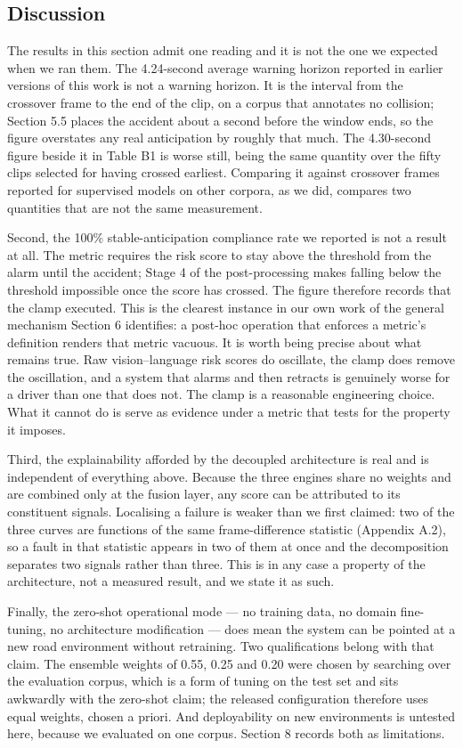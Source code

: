 \subsection{Discussion}
The results in this section admit one reading and it is not the one we expected when we ran them. The 4.24-second average warning horizon reported in earlier versions of this work is not a warning horizon. It is the interval from the crossover frame to the end of the clip, on a corpus that annotates no collision; Section 5.5 places the accident about a second before the window ends, so the figure overstates any real anticipation by roughly that much. The 4.30-second figure beside it in Table B1 is worse still, being the same quantity over the fifty clips selected for having crossed earliest. Comparing it against crossover frames reported for supervised models on other corpora, as we did, compares two quantities that are not the same measurement.

Second, the 100\% stable-anticipation compliance rate we reported is not a result at all. The metric requires the risk score to stay above the threshold from the alarm until the accident; Stage 4 of the post-processing makes falling below the threshold impossible once the score has crossed. The figure therefore records that the clamp executed. This is the clearest instance in our own work of the general mechanism Section 6 identifies: a post-hoc operation that enforces a metric's definition renders that metric vacuous. It is worth being precise about what remains true. Raw vision--language risk scores do oscillate, the clamp does remove the oscillation, and a system that alarms and then retracts is genuinely worse for a driver than one that does not. The clamp is a reasonable engineering choice. What it cannot do is serve as evidence under a metric that tests for the property it imposes.

Third, the explainability afforded by the decoupled architecture is real and is independent of everything above. Because the three engines share no weights and are combined only at the fusion layer, any score can be attributed to its constituent signals. Localising a failure is weaker than we first claimed: two of the three curves are functions of the same frame-difference statistic (Appendix A.2), so a fault in that statistic appears in two of them at once and the decomposition separates two signals rather than three. This is in any case a property of the architecture, not a measured result, and we state it as such.

Finally, the zero-shot operational mode --- no training data, no domain fine-tuning, no architecture modification --- does mean the system can be pointed at a new road environment without retraining. Two qualifications belong with that claim. The ensemble weights of 0.55, 0.25 and 0.20 were chosen by searching over the evaluation corpus, which is a form of tuning on the test set and sits awkwardly with the zero-shot claim; the released configuration therefore uses equal weights, chosen a priori. And deployability on new environments is untested here, because we evaluated on one corpus. Section 8 records both as limitations.
